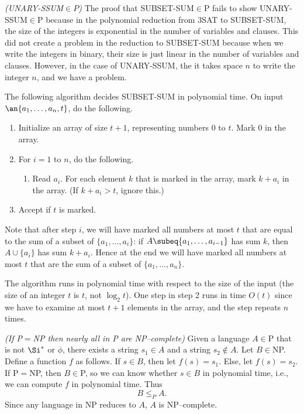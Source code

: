 \begin{problem}{\it(UNARY-SSUM$\in P$)}
The proof that SUBSET-SUM$\in$P fails to show UNARY-SSUM$\in $P because in the polynomial reduction from 3SAT to SUBSET-SUM, the size of the integers is exponential in the number of variables and clauses. This did not create a problem in the reduction to SUBSET-SUM because when we write the integers in binary, their size is just linear in the number of variables and clauses. However, in the case of UNARY-SSUM, the it takes space $n$ to write the integer $n$, and we have a problem.

The following algorithm decides SUBSET-SUM in polynomial time. On input $\an{a_1,\ldots, a_n,t}$, do the following.
\begin{enumerate}
\item
Initialize an array of size $t+1$, representing numbers 0 to $t$. Mark 0 in the array.
\item
For $i=1$ to $n$, do the following.
\begin{enumerate}
\item
Read $a_i$. For each element $k$ that is marked in the array, mark $k+a_i$ in the array. (If $k+a_i>t$, ignore this.)
\end{enumerate}
\item Accept if $t$ is marked.
\end{enumerate}
Note that after step $i$, we will have marked all numbers at most $t$ that are equal to the sum of a subset of $\{a_1,\ldots, a_i\}$: if $A\subeq \{a_1,\ldots, a_{i-1}\}$ has sum $k$, then $A\cup \{a_i\}$ has sum $k+a_i$. Hence at the end we will have marked all numbers at most $t$ that are the sum of a subset of $\{a_1,\ldots, a_n\}$.

The algorithm runs in polynomial time with respect to the size of the input (the size of an integer $t$ is $t$, not $\log_2 t$). One step in step 2 runs in time $O(t)$ since we have to examine at most $t+1$ elements in the array, and the step repeats $n$ times.
\end{problem}

\pagebreak

\begin{problem}{\it(If P$=$NP then nearly all in P are NP--complete)}
Given a language $A\in$P that is not $\Si^*$ or $\phi$, there exists a string $s_1\in A$ and a string $s_2\nin A$. Let $B\in $NP. Define a function $f$ as follows. If $s\in B$, then let $f(s)=s_1$. Else, let $f(s)=s_2$. If P$=$NP, then $B\in $P, so we can know whether $s\in B$ in polynomial time, i.e., we can compute $f$ in polynomial time. Thus
\[
B\le_P A.
\]
Since any language in NP reduces to $A$, $A$ is NP--complete.
\end{problem}

